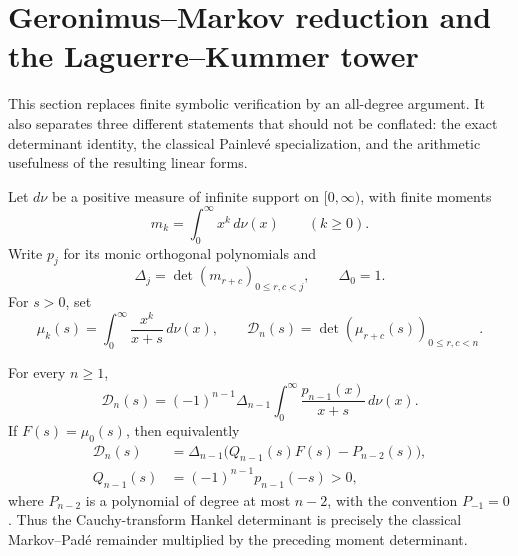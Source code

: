 
\section{Geronimus--Markov reduction and the Laguerre--Kummer tower}
\label{sec:geronimus-kummer}

This section replaces finite symbolic verification by an all-degree argument.
It also separates three different statements that should not be conflated:
the exact determinant identity, the classical Painlev\'e specialization, and
the arithmetic usefulness of the resulting linear forms.

Let \(d\nu\) be a positive measure of infinite support on
\([0,\infty)\), with finite moments
\[
  m_k=\int_0^\infty x^k\,d\nu(x) \qquad(k\geq 0).
\]
Write \(p_j\) for its monic orthogonal polynomials and
\[
  \Delta_j=\det(m_{r+c})_{0\leq r,c<j},\qquad \Delta_0=1.
\]
For \(s>0\), set
\[
  \mu_k(s)=\int_0^\infty\frac{x^k}{x+s}\,d\nu(x),
  \qquad
  \mathcal D_n(s)=\det(\mu_{r+c}(s))_{0\leq r,c<n}.
\]

\begin{theorem}
\label{thm:GM-reduction}
For every \(n\geq1\),
\begin{equation}
 \boxed{
 \mathcal D_n(s)=(-1)^{n-1}\Delta_{n-1}
 \int_0^\infty\frac{p_{n-1}(x)}{x+s}\,d\nu(x).}
 \label{eq:GM-reduction}
\end{equation}
If \(F(s)=\mu_0(s)\), then equivalently
\begin{equation}
 \begin{aligned}
 \mathcal D_n(s)
   &=\Delta_{n-1}\bigl(Q_{n-1}(s)F(s)-P_{n-2}(s)\bigr),\\
 Q_{n-1}(s)&=(-1)^{n-1}p_{n-1}(-s)>0,
 \end{aligned}
 \label{eq:Markov-Pade}
\end{equation}
where \(P_{n-2}\) is a polynomial of degree at most \(n-2\), with the
convention \(P_{-1}=0\).
Thus the Cauchy-transform Hankel determinant is precisely the classical
Markov--Pad\'e remainder multiplied by the preceding moment determinant.
\end{theorem}

